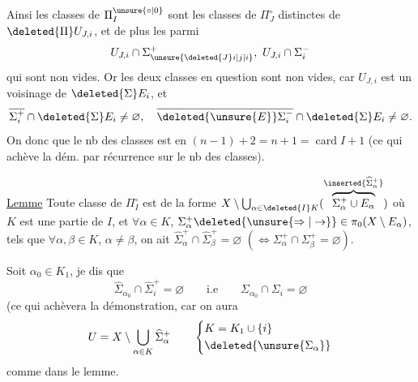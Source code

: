 Ainsi les classes de $\Pi_I^{\unsure{\circ|0}}$ sont les classes de $\Pi_J^\circ$ distinctes de $\deleted{\Pi}U_{J,i}$, et de plus les  parmi
\[
U_{J,i}\cap\Sigma_{\unsure{\deleted{J}i|j|i}}^+,\ U_{J,i}\cap\Sigma_i^-
\]
qui sont non vides. Or les deux classes en question sont non vides, car  $U_{J,i}$ est un voisinage de $\deleted{\Sigma}E_i$, et
\[
\overline{\Sigma_i^+}\cap\deleted{\Sigma}E_i\ne\varnothing,\quad
\overline{\deleted{\unsure{E}}\Sigma_i^-}\cap\deleted{\Sigma}E_i\ne\varnothing.
\]
On  donc que le nb des classes est en  $(n-1)+2=n+1=\operatorname{card} I+1$ (ce qui achève  la dém. par récurrence sur le nb des classes).

\uline{Lemme} Toute classe de $\Pi_I^\circ$ est de la forme $X\setminus\bigcup_{\alpha\in\deleted{I}K}(\overbrace{\Sigma_\alpha^+\cup E_\alpha}^{\inserted{\widehat{\Sigma}_\alpha^+}})$ où $K$ est une partie  de $I$, et
\reversemarginpar{}\normalmarginpar
$\forall\alpha\in K$,  $\Sigma_\alpha^+\deleted{\unsure{\Rightarrow|\to}}\in\pi_0(X\setminus E_\alpha)$, tels que $\forall\alpha,\beta\in K$, $\alpha\ne\beta$, on ait $\widehat{\Sigma}_\alpha^+\cap\widehat{\Sigma}_\beta^+=\varnothing$ $(\Longleftrightarrow\Sigma_\alpha^+\cap\Sigma_\beta^+=\varnothing)$.

Soit $\alpha_0\in K_1$, je dis que 
\[
\widehat{\Sigma}_{\alpha_0}\cap\widehat{\Sigma}_i^+=\varnothing
\qquad\text{i.e}\qquad
\Sigma_{\alpha_0}\cap\Sigma_i=\varnothing
\]
(ce qui achèvera la démonstration, car on aura
\[
U=X\setminus\bigcup_{\alpha\in K}\widehat{\Sigma}_\alpha^+
\qquad\left\{\begin{aligned}
&K=K_1\cup\{i\}\\
&\deleted{\unsure{\Sigma_\alpha}}
\end{aligned}\right.
\]
comme dans le lemme.

